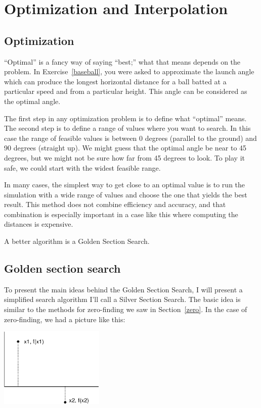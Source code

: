 \documentclass{book}
\begin{document}
\chapter{Optimization and Interpolation}
\section{Optimization}

``Optimal'' is a fancy way of saying ``best;'' what that means depends on the problem.
In Exercise~\ref{baseball}, you were asked to approximate the launch angle which
can produce the longest horizontal distance for a ball batted at a particular speed
and from a particular height.  This angle can be considered as the
optimal angle.

The first step in any optimization problem is to define
what ``optimal'' means.  The second step is to define a range of
values where you want to search. In this case the range of
feasible values is between 0 degrees (parallel to the ground)
and 90 degrees (straight up).  We might guess that the
optimal angle be near to 45 degrees, but we might not be sure
how far from 45 degrees to look.  To play it safe, we could
start with the widest feasible range.

In many cases,
the simplest way to get close to an optimal value is to run the
simulation with a wide range of values and choose the one
that yields the best result.  This
method does not combine efficiency and accuracy,
and that combination is especially important in a case like this where
computing the distances is expensive.

A better algorithm is a Golden Section Search.

\section{Golden section search}

To present the main ideas behind
the Golden Section Search, I will present a simplified
search algorithm I'll call a Silver Section Search.  The basic idea is similar to
the methods for zero-finding we saw in Section~\ref{zero}.  In the
case of zero-finding, we had a picture like this:

\beforefig \centerline{\includegraphics[height=1.5in]{figs/secant.eps}}
\end{document}
